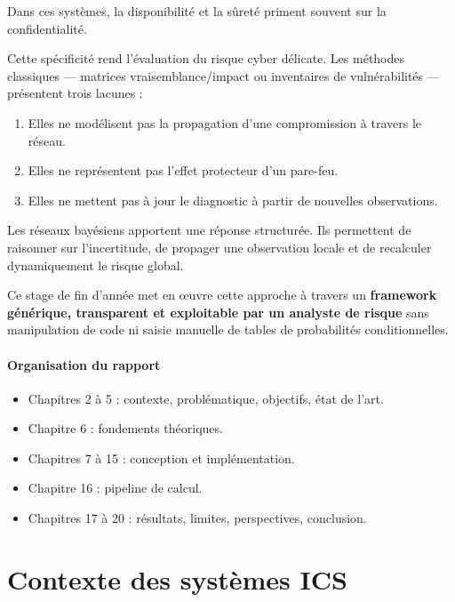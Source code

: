 \documentclass[12pt,a4paper]{article}
\newcommand{\forcereset}[1]{}
\begin{document}
Dans ces systèmes, la disponibilité et la sûreté priment souvent sur la confidentialité.

Cette spécificité rend l'évaluation du risque cyber délicate. Les méthodes classiques --- matrices vraisemblance/impact ou inventaires de vulnérabilités --- présentent trois lacunes :
\begin{enumerate}
    \item Elles ne modélisent pas la propagation d'une compromission à travers le réseau.
    \item Elles ne représentent pas l'effet protecteur d'un pare-feu.
    \item Elles ne mettent pas à jour le diagnostic à partir de nouvelles observations.
\end{enumerate}

Les réseaux bayésiens apportent une réponse structurée. Ils permettent de raisonner sur l'incertitude, de propager une observation locale et de recalculer dynamiquement le risque global.

Ce stage de fin d'année met en œuvre cette approche à travers un \textbf{framework générique, transparent et exploitable par un analyste de risque} sans manipulation de code ni saisie manuelle de tables de probabilités conditionnelles.

\paragraph{Organisation du rapport}
\begin{itemize}
    \item Chapitres 2 à 5 : contexte, problématique, objectifs, état de l'art.
    \item Chapitre 6 : fondements théoriques.
    \item Chapitres 7 à 15 : conception et implémentation.
    \item Chapitre 16 : pipeline de calcul.
    \item Chapitres 17 à 20 : résultats, limites, perspectives, conclusion.
\end{itemize}

\section{Contexte des systèmes ICS}
\forcereset{6}
\end{document}
